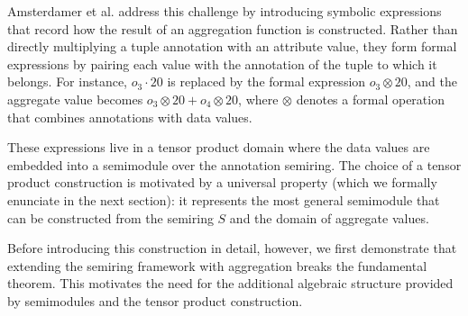 \documentclass[oneside, 11pt]{amsbook}
\theoremstyle{plain}
\theoremstyle{definition}
\theoremstyle{remark}
\begin{document}
Amsterdamer et al. address this challenge by introducing symbolic expressions that record how the result of an aggregation function is constructed. Rather than directly multiplying a tuple annotation with an attribute value, they form formal expressions by pairing each value with the annotation of the tuple to which it belongs. For instance, $o_3 \cdot 20$ is replaced by the formal expression $o_3 \otimes 20$, and the aggregate value becomes $o_3 \otimes 20 + o_4 \otimes 20$, where $\otimes$ denotes a formal operation that combines annotations with data values.

These expressions live in a tensor product domain where the data values are embedded into a semimodule over the annotation semiring. The choice of a tensor product construction is motivated by a universal property (which we formally enunciate in the next section): it represents the most general semimodule that can be constructed from the semiring $S$ and the domain of aggregate values.

Before introducing this construction in detail, however, we first demonstrate that extending the semiring framework with aggregation breaks the fundamental theorem. This motivates the need for the additional algebraic structure provided by semimodules and the tensor product construction.
\end{document}
